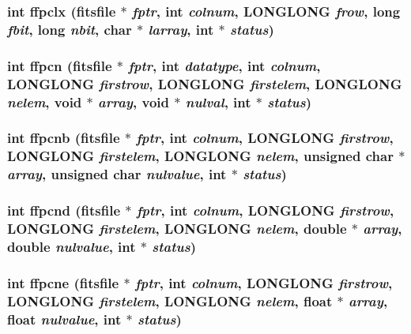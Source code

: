 \subsubsection{\setlength{\rightskip}{0pt plus 5cm}int ffpclx (\bf{fitsfile} $\ast$ {\em fptr}, int {\em colnum}, \bf{LONGLONG} {\em frow}, long {\em fbit}, long {\em nbit}, char $\ast$ {\em larray}, int $\ast$ {\em status})}\label{fitsio_8h_36824bfe44a4dbdee167ea243384cab2}


\subsubsection{\setlength{\rightskip}{0pt plus 5cm}int ffpcn (\bf{fitsfile} $\ast$ {\em fptr}, int {\em datatype}, int {\em colnum}, \bf{LONGLONG} {\em firstrow}, \bf{LONGLONG} {\em firstelem}, \bf{LONGLONG} {\em nelem}, void $\ast$ {\em array}, void $\ast$ {\em nulval}, int $\ast$ {\em status})}\label{fitsio_8h_a062602b8a804f46be72152477dc2321}


\subsubsection{\setlength{\rightskip}{0pt plus 5cm}int ffpcnb (\bf{fitsfile} $\ast$ {\em fptr}, int {\em colnum}, \bf{LONGLONG} {\em firstrow}, \bf{LONGLONG} {\em firstelem}, \bf{LONGLONG} {\em nelem}, unsigned char $\ast$ {\em array}, unsigned char {\em nulvalue}, int $\ast$ {\em status})}\label{fitsio_8h_52e1f7ec25307939c85af2e5ab92fe5f}


\subsubsection{\setlength{\rightskip}{0pt plus 5cm}int ffpcnd (\bf{fitsfile} $\ast$ {\em fptr}, int {\em colnum}, \bf{LONGLONG} {\em firstrow}, \bf{LONGLONG} {\em firstelem}, \bf{LONGLONG} {\em nelem}, double $\ast$ {\em array}, double {\em nulvalue}, int $\ast$ {\em status})}\label{fitsio_8h_521f9cb2a81ba66277d032513255e1f6}


\subsubsection{\setlength{\rightskip}{0pt plus 5cm}int ffpcne (\bf{fitsfile} $\ast$ {\em fptr}, int {\em colnum}, \bf{LONGLONG} {\em firstrow}, \bf{LONGLONG} {\em firstelem}, \bf{LONGLONG} {\em nelem}, float $\ast$ {\em array}, float {\em nulvalue}, int $\ast$ {\em status})}\label{fitsio_8h_e90f56227753bb7883ba1b42e31a5f00}


